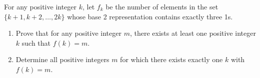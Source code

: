 For any positive integer $ k$,  let $ f_k$ be the number of elements in the set $ \{ k + 1, k + 2, \ldots, 2k\}$ whose base 2 representation contains exactly three 1s.

\begin{enumerate}[label = (\alph*)]
	\item Prove that for any positive integer $ m$,  there exists at least one positive integer $ k$ such that $ f(k) = m$.
	\item Determine all positive integers $ m$ for which there exists exactly one $ k$ with $ f(k) = m$.
\end{enumerate}
